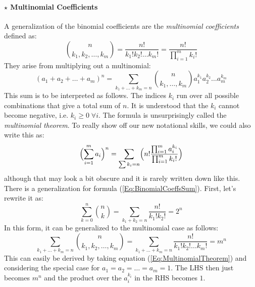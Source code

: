 \paragraph{$\star$ Multinomial Coefficients}
A generalization of the binomial coefficients are the \emph{multinomial coefficients} defined as:
\begin{equation}
\label{Eq:MultinomialCoeffs}
 \binom{n}{k_1,k_2,\ldots,k_m} 
= \frac{n!}{k_1! k_2! \ldots k_m!}
= \frac{n!}{ \prod_{i=1}^{m} k_i ! }
\end{equation}
They arise from multiplying out a multinomial:
\begin{equation}
\label{Eq:MultinomialTheorem}
(a_1 + a_2 + \ldots + a_m)^n 
= \sum_{k_1+\ldots+k_m = n} \binom{n}{k_1, \ldots, k_m} a_1^{k_1} a_2^{k_2} \ldots a_m^{k_m}
\end{equation}
This sum is to be interpreted as follows. The indices $k_i$ run over all possible combinations that give a total sum of $n$. It is understood that the $k_i$ cannot become negative, i.e. $k_i \geq 0 \; \forall i$. The formula is unsurprisingly called the \emph{multinomial theorem}. To really show off our new notational skills, we could also write this as:
\begin{equation}
\Bigl( \sum_{i=1}^{m} a_i \Bigr)^n
= \sum_{\sum k_i = n} \Bigl( n! \frac{\prod_{i=1}^{m} a_i^{k_i}} {\prod_{i=1}^{m} k_i!} \Bigr)
\end{equation}
although that may look a bit obscure and it is rarely written down like this. There is a generalization for formula (\ref{Eq:BinomialCoeffsSum}). First, let's rewrite it as:
\begin{equation}
\sum_{k=0}^n \binom{n}{k} 
= \sum_{k_1 + k_2 = n} \frac{n!}{k_1! k_2!}
= 2^n
\end{equation}
In this form, it can be generalized to the multinomial case as follows:
\begin{equation}
\label{Eq:MultinomialCoeffsSum}
  \sum_{k_1+\ldots+k_m = n} \binom{n}{k_1,k_2,\ldots,k_m} 
= \sum_{k_1+\ldots+k_m = n} \frac{n!}{k_1! k_2! \ldots k_m!}
= m^n
\end{equation}
This can easily be derived by taking equation (\ref{Eq:MultinomialTheorem}) and considering the special case for $a_1 = a_2 = \ldots = a_m = 1$. The LHS then just becomes $m^n$ and the product over the $a_i^{k_i}$ in the RHS becomes $1$.



